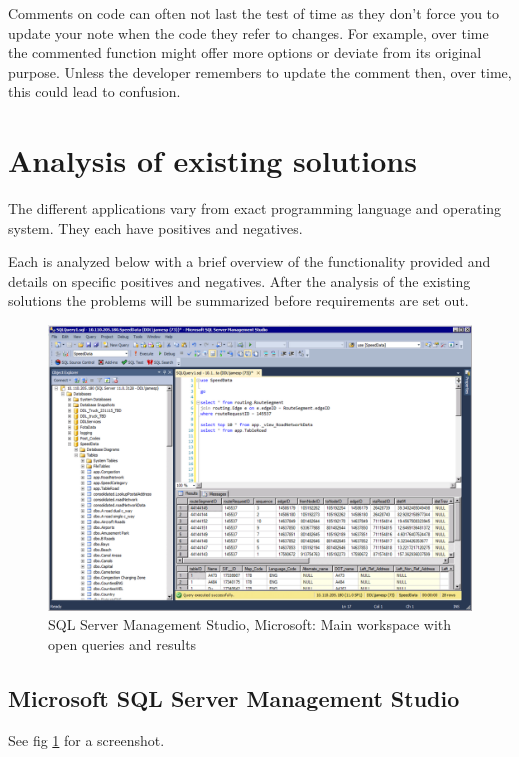Comments on code can often not last the test of time as they don't force you to
update your note when the code they refer to changes. For example, over time the
commented function might offer more options or deviate from its original
purpose. Unless the developer remembers to update the comment then, over time, this could lead to confusion.

\section{Analysis of existing solutions}\label{analysis-of-existing-solutions}

The different applications vary from exact programming language and
operating system. They each have positives and negatives.

Each is analyzed below with a brief overview of the functionality provided and details on specific positives and negatives. After the analysis of the existing solutions the problems will be summarized before requirements are set out.


\begin{figure}
  \includegraphics[width=\linewidth]{Figures/SSMS.png}
  \caption{SQL Server Management Studio, Microsoft: Main workspace with open queries and results}
  \label{fig:ssms}
\end{figure}

\subsection{Microsoft SQL Server Management Studio}\label{microsoft-sql-server-management-studio}

\noindent
See fig \ref{fig:ssms} for a screenshot.

